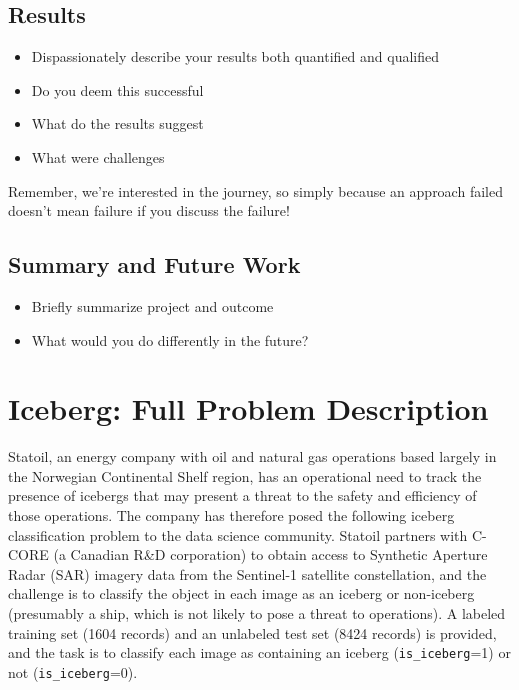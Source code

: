 \documentclass[fleqn,10pt]{SelfArx} %
\begin{document}


\subsection{Results}
\begin{itemize}[noitemsep]
\item Dispassionately describe your results both quantified and qualified
\item Do you deem this successful
\item What do the results suggest
\item What were challenges
\end{itemize}
Remember, we're interested in the journey, so simply because an approach failed doesn't mean failure if you discuss the failure!
\subsection{Summary and Future Work}
\begin{itemize}[noitemsep]
\item Briefly summarize project and outcome
\item What would you do differently in the future?
\end{itemize}

\lipsum[10] %
\section{Iceberg: Full Problem Description}

Statoil, an energy company with oil and natural gas operations based largely in the Norwegian Continental Shelf region, has an operational need to track the presence of icebergs that may present a threat to the safety and efficiency of those operations. \cite{statoil} The company has therefore posed the following iceberg classification problem to the data science community.  Statoil partners with C-CORE (a Canadian R\&D corporation) to obtain access to Synthetic Aperture Radar (SAR) imagery data from the Sentinel-1 satellite constellation, and the challenge is to classify the object in each image as an iceberg or non-iceberg (presumably a ship, which is not likely to pose a threat to operations). A labeled training set (1604 records) and an unlabeled test set (8424 records) is provided, and the task is to classify each image as containing an iceberg (\texttt{is\_iceberg}=1) or not (\texttt{is\_iceberg}=0). \cite{kaggle}
\end{document}
